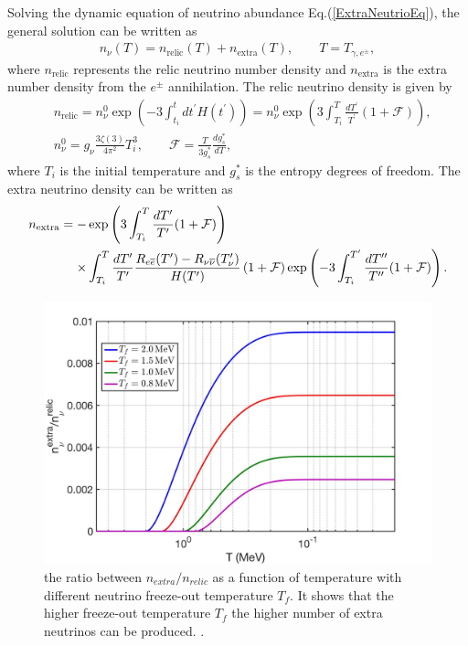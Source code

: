 Solving the dynamic equation of neutrino abundance Eq.(\ref{ExtraNeutrioEq}), the general solution can be written as
\begin{align}
n_\nu(T)=n_\mathrm{relic}(T)+n_\mathrm{extra}(T),\qquad T=T_{\gamma,e^\pm},
\end{align}
where $n_\mathrm{relic}$ represents the relic neutrino number density and $n_\mathrm{extra}$ is the extra number density from the $e^\pm$ annihilation. The relic neutrino density is given by
\begin{align}  &n_\mathrm{relic}=n_\nu^0\exp\left(-3\int_{t_i}^t{dt^\prime}H(t^\prime)\right)=n_\nu^0\exp\left(3\int_{T_i}^T\frac{dT^\prime}{T^\prime}(1+\mathcal{F})\right),\\
&n^0_\nu=g_\nu\frac{3\zeta(3)}{4\pi^2}T^3_i,\qquad \mathcal{F}=\frac{T}{3g^\ast_s}\frac{dg^\ast_s}{dT},
\end{align}
where $T_i$ is the initial temperature and $g^\ast_s$ is the entropy degrees of freedom. The extra neutrino density can be written as
\begin{align}
n_\mathrm{extra}=-&\exp\left(3\int_{T_i}^T\frac{dT^\prime}{T^\prime}(1+\mathcal{F})\right)\notag\\
\times&\int_{T_i}^T\frac{dT^\prime}{T^\prime}\frac{R_{e\overline{e}}(T^\prime)-R_{\nu\overline{\nu}}(T^\prime_\nu)}{H(T^\prime)}\left(1+\mathcal{F}\right)\exp\left(-3\int_{T_i}^{T^{\prime}}\frac{dT^{\prime\prime}}{T^{\prime\prime}}(1+\mathcal{F})\right).
\end{align}
\begin{figure}[ht]
\begin{center}
\includegraphics[width=0.9\linewidth]{./plots/ExtraNeutrinoRatio}
\caption{the ratio between $n_{extra}/n_{relic}$ as a function of temperature with different neutrino freeze-out temperature $T_f$. It shows that the higher freeze-out temperature $T_f$ the higher number of extra neutrinos can be produced. .}
\label{ExtraNeutrinoRatio}
\end{center}
\end{figure}


